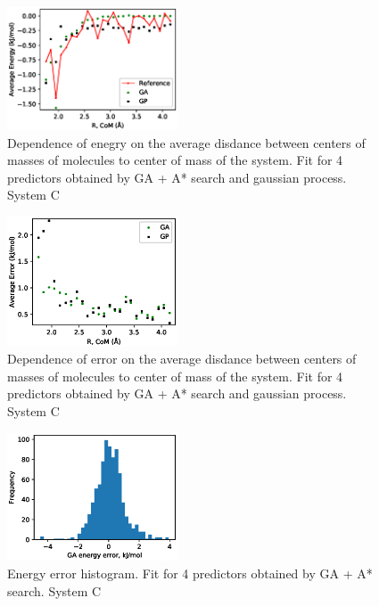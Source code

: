 \documentclass[aps,prl,reprint,amsmath,amssymb,nature]{revtex4-1}
\begin{document}
\begin{figure}
\includegraphics[width=0.45\textwidth]{media/C_Energy_4_predictors.eps}
\caption{Dependence of enegry on the average disdance between centers of masses of molecules to center of mass of the system. Fit for 4 predictors obtained by GA + A* search and gaussian process. System C}\label{Fig:C_Energy_4_predictors}
\end{figure}

\begin{figure}
\includegraphics[width=0.45\textwidth]{media/C_Error_4_predictors.eps}
\caption{Dependence of error on the average disdance between centers of masses of molecules to center of mass of the system. Fit for 4 predictors obtained by GA + A* search and gaussian process. System C}\label{Fig:C_RMSE_4_predictors}
\end{figure}

\begin{figure}
\includegraphics[width=0.45\textwidth]{media/C_GA_energy_error_histogram_4_predictors.eps}
\caption{Energy error histogram. Fit for 4 predictors obtained by GA + A* search. System C}\label{Fig:C_histogram_4_predictors}
\end{figure}
\end{document}
